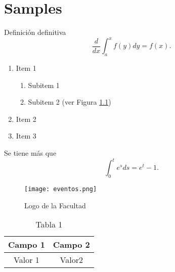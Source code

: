 \chapter{Samples}

\begin{defn} Definición definitiva $$\frac{d}{dx}\int_a^xf(y)dy=f(x).$$\end{defn}

\begin{enumerate}
	\item Item 1
	\begin{enumerate}
		\item Subitem 1
		\item Subitem 2 (ver Figura \ref{logofcfm})
	\end{enumerate}
	\item Item 2
	\item Item 3
\end{enumerate}
\begin{teo}
	Se tiene más que $$\int_0^t e^sds=e^t-1.$$
\end{teo}

\begin{figure}[!h]
	\centering
	\texttt{[image: eventos.png]}
	\caption{Logo de la Facultad}
	\label{logofcfm}
\end{figure}

\begin{table}[!h]
	\centering
	\begin{tabular}{|c||c|}
		\hline
		Campo 1& Campo 2\\\hline
		Valor 1& Valor2\\\hline
	\end{tabular}
	\caption{Tabla 1}
	\label{tabla:1}
\end{table}

\lipsum[36-40]